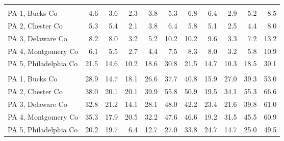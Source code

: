 \begin{longtable}[l]{l|rrrrrrrrrr}
\addlinespace[0.5em]
\multicolumn{11}{l}{\textbf{\% in poverty}}\\
\hspace{1em}PA 1, Bucks Co & 4.6 & 3.6 & 2.3 & 3.8 & 5.3 & 6.8 & 6.4 & 2.9 & 5.2 & 8.5\\
\hspace{1em}PA 2, Chester Co & 5.3 & 5.4 & 2.1 & 3.8 & 6.4 & 5.8 & 5.1 & 2.5 & 4.4 & 8.0\\
\hspace{1em}PA 3, Delaware Co & 8.2 & 8.0 & 3.2 & 5.2 & 10.2 & 10.2 & 9.6 & 3.3 & 7.2 & 13.2\\
\hspace{1em}PA 4, Montgomery Co & 6.1 & 5.5 & 2.7 & 4.4 & 7.5 & 8.3 & 8.0 & 3.2 & 5.8 & 10.9\\
\hspace{1em}PA 5, Philadelphia Co & 21.5 & 14.6 & 10.2 & 18.6 & 30.8 & 21.5 & 14.7 & 10.3 & 18.5 & 30.1\\
\addlinespace[0.5em]
\multicolumn{11}{l}{\textbf{\% with BA+}}\\
\hspace{1em}PA 1, Bucks Co & 28.9 & 14.7 & 18.1 & 26.6 & 37.7 & 40.8 & 15.9 & 27.0 & 39.3 & 53.0\\
\hspace{1em}PA 2, Chester Co & 38.0 & 20.1 & 20.1 & 39.9 & 55.8 & 50.9 & 19.5 & 34.1 & 55.3 & 66.6\\
\hspace{1em}PA 3, Delaware Co & 32.8 & 21.2 & 14.1 & 28.1 & 48.0 & 42.2 & 23.4 & 21.6 & 39.8 & 61.0\\
\hspace{1em}PA 4, Montgomery Co & 35.3 & 17.9 & 20.5 & 32.2 & 47.6 & 46.6 & 19.2 & 31.5 & 45.5 & 60.9\\
\hspace{1em}PA 5, Philadelphia Co & 20.2 & 19.7 & 6.4 & 12.7 & 27.0 & 33.8 & 24.7 & 14.7 & 25.0 & 49.5\\*
\end{longtable}
\endgroup{}
